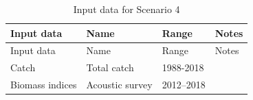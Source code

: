 \documentclass[
]{article}
\begin{document}
\begin{longtable}[]{@{}llll@{}}
\caption{Input data for Scenario 4}\tabularnewline
\toprule
\begin{minipage}[b]{0.21\columnwidth}\raggedright
Input data\strut
\end{minipage} & \begin{minipage}[b]{0.20\columnwidth}\raggedright
Name\strut
\end{minipage} & \begin{minipage}[b]{0.15\columnwidth}\raggedright
Range\strut
\end{minipage} & \begin{minipage}[b]{0.33\columnwidth}\raggedright
Notes\strut
\end{minipage}\tabularnewline
\midrule
\endfirsthead
\toprule
\begin{minipage}[b]{0.21\columnwidth}\raggedright
Input data\strut
\end{minipage} & \begin{minipage}[b]{0.20\columnwidth}\raggedright
Name\strut
\end{minipage} & \begin{minipage}[b]{0.15\columnwidth}\raggedright
Range\strut
\end{minipage} & \begin{minipage}[b]{0.33\columnwidth}\raggedright
Notes\strut
\end{minipage}\tabularnewline
\midrule
\endhead
\begin{minipage}[t]{0.21\columnwidth}\raggedright
Catch\strut
\end{minipage} & \begin{minipage}[t]{0.20\columnwidth}\raggedright
Total catch\strut
\end{minipage} & \begin{minipage}[t]{0.15\columnwidth}\raggedright
1988-2018\strut
\end{minipage} & \begin{minipage}[t]{0.33\columnwidth}\raggedright
\strut
\end{minipage}\tabularnewline
\begin{minipage}[t]{0.21\columnwidth}\raggedright
Biomass indices\strut
\end{minipage} & \begin{minipage}[t]{0.20\columnwidth}\raggedright
Acoustic survey\strut
\end{minipage} & \begin{minipage}[t]{0.15\columnwidth}\raggedright
2012--2018\strut
\end{minipage} & \begin{minipage}[t]{0.33\columnwidth}\raggedright

\end{minipage}
\end{longtable}
\end{document}
